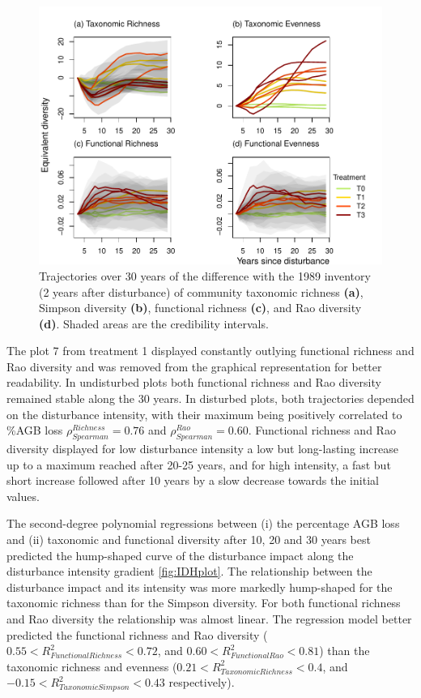 \documentclass[
  11pt,
  french,
  A4paper,
  extrafontsizes,onecolumn,openright
  ]{memoir}
\begin{document}
\begin{figure}

{\centering \includegraphics[width=1\linewidth]{Manuscript_files/figure-latex/DivTaxo-1} 

}

\caption{Trajectories over 30 years of the difference with the 1989 inventory (2 years after disturbance) of community taxonomic richness \textbf{(a)}, Simpson diversity \textbf{(b)}, functional richness \textbf{(c)}, and Rao diversity \textbf{(d)}. Shaded areas are the credibility intervals.}\label{fig:DivTaxo}
\end{figure}

The plot 7 from treatment 1 displayed constantly outlying functional
richness and Rao diversity and was removed from the graphical
representation for better readability. In undisturbed plots both
functional richness and Rao diversity remained stable along the 30
years. In disturbed plots, both trajectories depended on the disturbance
intensity, with their maximum being positively correlated to \%AGB loss
\(\rho_{Spearman}^{Richness}=0.76\) and \(\rho_{Spearman}^{Rao}=0.60\).
Functional richness and Rao diversity displayed for low disturbance
intensity a low but long-lasting increase up to a maximum reached after
20-25 years, and for high intensity, a fast but short increase followed
after 10 years by a slow decrease towards the initial values.

The second-degree polynomial regressions between (i) the percentage AGB
loss and (ii) taxonomic and functional diversity after 10, 20 and 30
years best predicted the hump-shaped curve of the disturbance impact
along the disturbance intensity gradient \ref{fig:IDHplot}. The
relationship between the disturbance impact and its intensity was more
markedly hump-shaped for the taxonomic richness than for the Simpson
diversity. For both functional richness and Rao diversity the
relationship was almost linear. The regression model better predicted
the functional richness and Rao diversity
(\(0.55<R^2_{Functional Richness}<0.72\), and
\(0.60<R^2_{Functional Rao}<0.81\)) than the taxonomic richness and
evenness (\(0.21<R^2_{Taxonomic Richness}<0.4\), and
\(-0.15<R^2_{Taxonomic Simpson}<0.43\) respectively).
\end{document}
